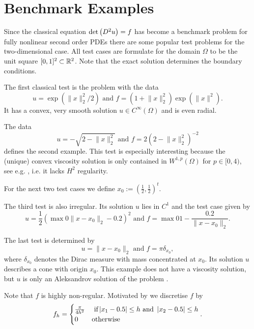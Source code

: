 \section{Benchmark Examples}

Since the classical \MA equation $\det{\left(D^2 u\right)} = f$ has become a benchmark problem for fully nonlinear second order PDEs there are some popular test problems for the two-dimensional case. All test cases are formulate for the domain $\Omega$ to be the unit square $[0,1]^2 \subset \mathbb{R}^2$. Note that the exact solution determines the boundary conditions.

\begin{test} \label{test smooth}
The first classical \MA test is the problem with the data
\[
	u=\exp( \lVert x \rVert_2^2  /2) 
	\text { and } 
	f = (1 + \lVert x \rVert_2^2) \exp( \lVert x \rVert^2).
\]
It has a convex, very smooth solution $u \in C^\infty(\Omega)$ and is even radial.

\end{test}

\begin{test}\label{test sqrt}
The data
\[
	u = - \sqrt{ 2-  \lVert x \rVert_2^2}
	\text { and } 
	f = 2\left( 2-  \lVert x \rVert_2^2 \right)^{-2}
\]
defines the second example. This test is especially interesting because the (unique) convex viscosity solution is only contained in $W^{1,p}(\Omega) $ for $p \in [0,4)$, see e.g. \cite{DG2006a}, i.e. it lacks $H^2$ regularity.
\end{test}

For the next two test cases we define $x_0 := \left(\frac 1 2, \frac 1 2  \right)^t$.

\begin{test}\label{test singularity}
The third \MA test is also irregular. Its solution $u$ lies in $C^1$ and the test case given by
\[
	u=\frac 1 2 \left( \max 0 {\lVert x - x_0 \rVert_2-0.2 }  \right)^2 
	\text { and } 
	f = \max 0 {1-\frac {0.2} {\lVert x - x_0 \rVert_2} }.
\]
\end{test}


\begin{test}\label{test dirac}
The last test is determined by
\[
	u = \lVert x - x_0 \rVert_2
	\text { and } 
	f = \pi \delta_{x_0},
\]
where $\delta_{x_0}$ denotes the Dirac measure with mass concentrated at $x_0$. Its solution $u$ describes a cone with origin $x_0$. This example does not have a viscosity solution, but $u$ is only an Aleksandrov solution of the problem \cite[Section 2.3.]{FO2011}.

Note that $f$ is highly non-regular. Motivated by \cite[Section 6.1.]{FO2011} we discretise $f$ by
\begin{align*}
	f_h = \begin{cases}
		\frac \pi {4h^2} & \text{ if} \left| x_1 - 0.5 \right| \leq h \text{ and } \left| x_2 - 0.5 \right| \leq h \\
		0	& \text{otherwise}
	\end{cases}.
\end{align*}
\end{test}


